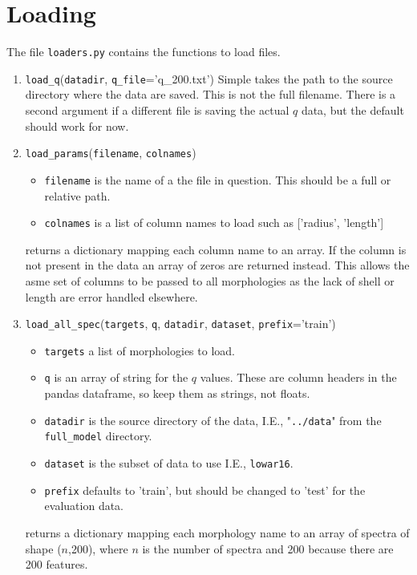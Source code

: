 \documentclass{article}
\begin{document}
\section{Loading}
The file \texttt{loaders.py} contains the functions to load files.
\begin{enumerate}
\item \texttt{load\_q}(\texttt{datadir}, \texttt{q\_file}='q\_200.txt')
Simple takes the path to the source directory where the data are saved. This is not the full filename. There is a second argument if a different file is saving the actual $q$ data, but the default should work for now.
\item \texttt{load\_params}(\texttt{filename}, \texttt{colnames})
\begin{itemize}
\item \texttt{filename} is the name of a the file in question. This should be a full or relative path.
\item \texttt{colnames} is a list of column names to load such as ['radius', 'length']
\end{itemize}
returns a dictionary mapping each column name to an array.  If the column is not present in the data an array of zeros are returned instead.
This allows the asme set of columns to be passed to all morphologies as the lack of shell or length are error handled elsewhere.
\item \texttt{load\_all\_spec}(\texttt{targets}, \texttt{q}, \texttt{datadir}, \texttt{dataset}, \texttt{prefix}='train')
\begin{itemize}
\item \texttt{targets} a list of morphologies to load.
\item \texttt{q} is an array of string for the $q$ values. These are column headers in the pandas dataframe, so keep them as strings, not floats.
\item \texttt{datadir} is the source directory of the data, I.E., "\texttt{../data}" from the \texttt{full\_model} directory.
\item \texttt{dataset} is the subset of data to use I.E., \texttt{lowar16}.
\item \texttt{prefix} defaults to 'train', but should be changed to 'test' for the evaluation data.
\end{itemize}
returns a dictionary mapping each morphology name to an array of spectra of shape ($n$,200), where $n$ is the number of spectra and 200 because there are 200 features.


\end{enumerate}
\end{document}
